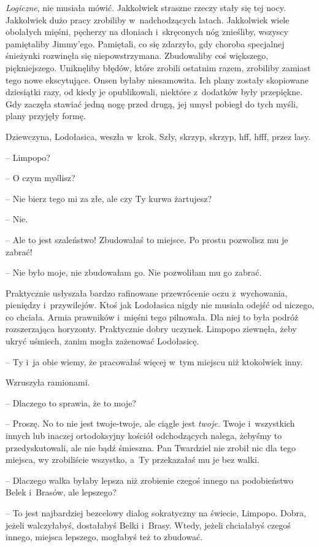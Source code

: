 \documentclass[oneside,polish,11pt,sfheadings]{mwbk}
\begin{document}
\textit{Logiczne}, nie musiała mówić. Jakkolwiek straszne rzeczy stały się
tej nocy. Jakkolwiek dużo pracy zrobiliby w~nadchodzących latach.
Jakkolwiek wiele obolałych mięśni, pęcherzy na dłoniach i~skręconych nóg
znieśliby, wszyscy pamiętaliby Jimmy'ego. Pamiętali, co się zdarzyło,
gdy choroba specjalnej śnieżynki rozwinęła się niepowstrzymana.
Zbudowaliby coś większego, piękniejszego. Uniknęliby błędów, które
zrobili ostatnim razem, zrobiliby zamiast tego nowe ekscytujące. Onsen
byłaby niesamowita. Ich plany zostały skopiowane dziesiątki razy, od
kiedy je opublikowali, niektóre z~dodatków były przepiękne. Gdy zaczęła
stawiać jedną nogę przed drugą, jej umysł pobiegł do tych myśli, plany
przyjęły formę.

Dziewczyna, Lodołasica, weszła w~krok. Szły, skrzyp, skrzyp, hff, hfff,
przez lasy. 

-- Limpopo?

-- O czym myślisz?

-- Nie bierz tego mi za złe, ale czy Ty kurwa żartujesz?

-- Nie.

-- Ale to jest szaleństwo! Zbudowałaś to miejsce. Po prostu pozwolisz mu
je zabrać!

-- Nie było moje, nie zbudowałam go. Nie pozwoliłam mu go zabrać.

Praktycznie usłyszała bardzo rafinowane przewrócenie oczu z~wychowania,
pieniędzy i~przywilejów. Ktoś jak Lodołasica nigdy nie musiała odejść od
niczego, co chciała. Armia prawników i~mięśni tego pilnowała. Dla niej
to była podróż rozszerzająca horyzonty. Praktycznie dobry uczynek.
Limpopo ziewnęła, żeby ukryć uśmiech, zanim mogła zażenować Lodołasicę.

-- Ty i~ja obie wiemy, że pracowałaś więcej w~tym miejscu niż ktokolwiek
inny.

Wzruszyła ramionami. 

-- Dlaczego to sprawia, że to moje?

-- Proszę. No to nie jest twoje-twoje, ale ciągle jest \textit{twoje}.
Twoje i~wszystkich innych lub inaczej ortodoksyjny kościół odchodzących
nalega, żebyśmy to przedyskutowali, ale nie bądź śmieszna. Pan Twardziel
nie zrobił nic dla tego miejsca, wy zrobiliście wszystko, a~Ty
przekazałaś mu je bez walki.

-- Dlaczego walka byłaby lepsza niż zrobienie czegoś innego na
podobieństwo Belek i~Brasów, ale lepszego?

-- To jest najbardziej bezcelowy dialog sokratyczny na świecie, Limpopo.
Dobra, jeżeli walczyłabyś, dostałabyś Belki i~Brasy. Wtedy, jeżeli
chciałabyś czegoś innego, miejsca lepszego, mogłabyś też to zbudować.
\end{document}
